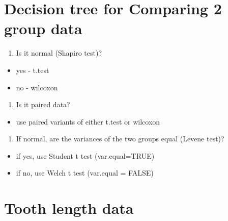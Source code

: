 \documentclass[
]{book}
\newenvironment{Shaded}{\begin{snugshade}}{\end{snugshade}}
\newcommand{\CommentTok}[1]{\textcolor[rgb]{0.56,0.35,0.01}{\textit{#1}}}
\newcommand{\KeywordTok}[1]{\textcolor[rgb]{0.13,0.29,0.53}{\textbf{#1}}}
\newcommand{\NormalTok}[1]{#1}
\providecommand{\tightlist}{%
  \setlength{\itemsep}{0pt}\setlength{\parskip}{0pt}}
\begin{document}
\begin{Shaded}
\end{Shaded}

\hypertarget{decision-tree-for-comparing-2-group-data}{%
\section{Decision tree for Comparing 2 group data}\label{decision-tree-for-comparing-2-group-data}}

\begin{enumerate}
\def\labelenumi{\arabic{enumi}.}
\tightlist
\item
  Is it normal (Shapiro test)?
\end{enumerate}

\begin{itemize}
\tightlist
\item
  yes - t.test
\item
  no - wilcoxon
\end{itemize}

\begin{enumerate}
\def\labelenumi{\arabic{enumi}.}
\setcounter{enumi}{1}
\tightlist
\item
  Is it paired data?
\end{enumerate}

\begin{itemize}
\tightlist
\item
  use paired variants of either t.test or wilcoxon
\end{itemize}

\begin{enumerate}
\def\labelenumi{\arabic{enumi}.}
\setcounter{enumi}{2}
\tightlist
\item
  If normal, are the variances of the two groups equal (Levene test)?
\end{enumerate}

\begin{itemize}
\tightlist
\item
  if yes, use Student t test (var.equal=TRUE)
\item
  if no, use Welch t test (var.equal = FALSE)
\end{itemize}

\hypertarget{tooth-length-data}{%
\section{Tooth length data}\label{tooth-length-data}}
\end{document}
